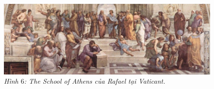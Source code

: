 	\begin{figure}[H]
		\vspace*{5pt}
		\centering
		\captionsetup{labelformat= empty, justification=centering}
		\includegraphics[width= 1\linewidth]{H7}
		\caption{\small\textit{\color{lichsutoanhoc}Hình $6$: The School of Athens của Rafael tại Vaticant.}}
		\vspace*{-10pt}
	\end{figure}
